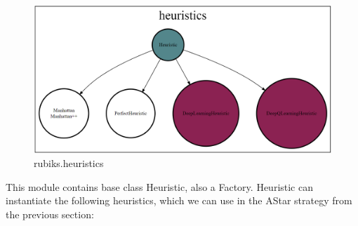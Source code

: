\begin{figure}[H]
\centering
\includegraphics[scale=0.25]{./Figures/codebaseheuristics}
\caption[Codebase]{rubiks.heuristics}
\label{fig:Codebaseheuristics}
\end{figure}
\label{HSS}
This module contains base class Heuristic, also a Factory. Heuristic can instantiate the following heuristics, which we can use in the AStar strategy from the previous section:
